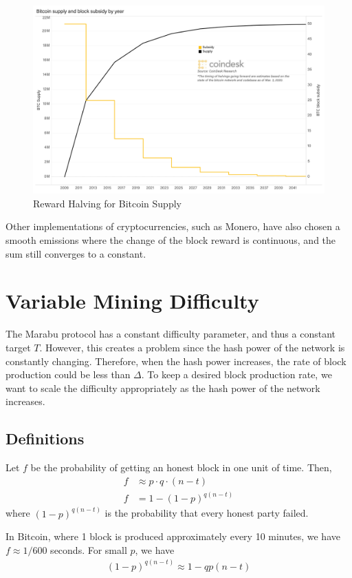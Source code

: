 \begin{figure}[ht]
    \centering
    \includegraphics[scale = 0.2]{figures/reward_halving.png}
    \caption{Reward Halving for Bitcoin Supply\cite{halving}}
    \label{fig:reward_halving}
\end{figure}

Other implementations of cryptocurrencies, such as Monero, have also chosen a smooth emissions where the change of the block reward is continuous, and the sum still converges to a constant.


\section{Variable Mining Difficulty}
The Marabu protocol has a constant difficulty parameter, and thus a constant target $T$. However, this creates a problem since the hash power of the network is constantly changing. Therefore, when the hash power increases, the rate of block production could be less than $\Delta$. To keep a desired block production rate, we want to scale the difficulty appropriately as the hash power of the network increases.

\subsection{Definitions}

\begin{definition}
    Let $f$ be the probability of getting an honest block in one unit of time. Then,
\begin{align*}
    f &\approx p \cdot q \cdot (n-t) \\
    f &= 1- (1-p)^{q(n-t)}
\end{align*}
where $(1-p)^{q(n-t)}$ is the probability that every honest party failed.
\end{definition}
In Bitcoin, where 1 block is produced approximately every 10 minutes, we have $f \approx 1/600$ seconds. For small $p$, we have
\begin{align*}
    (1-p)^{q(n-t)} \approx 1 - qp(n-t)
\end{align*}


